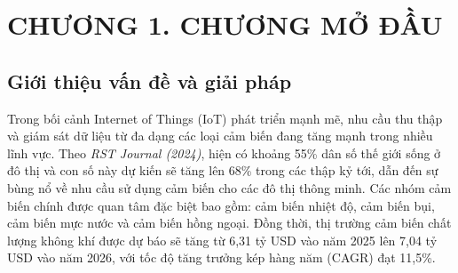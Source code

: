 \documentclass{article} %
\begin{document}


\tableofcontents 
\thispagestyle{empty}
\cleardoublepage


{\let\oldnumberline\numberline
\renewcommand{\numberline}{Hình~\oldnumberline}
\listoffigures} 
\newpage

{\let\oldnumberline\numberline
\renewcommand{\numberline}{Bảng~\oldnumberline}
\listoftables}
\newpage

\newpage

\section*{CHƯƠNG 1.  CHƯƠNG MỞ ĐẦU}
\setcounter{section}{1}
\subsection{Giới thiệu vấn đề và giải pháp}
Trong bối cảnh Internet of Things (IoT) phát triển mạnh mẽ, nhu cầu thu thập và giám sát dữ liệu từ đa dạng các loại cảm biến đang tăng mạnh trong nhiều lĩnh vực. Theo \textit{RST Journal (2024)}, hiện có khoảng 55\% dân số thế giới sống ở đô thị và con số này dự kiến sẽ tăng lên 68\% trong các thập kỷ tới, dẫn đến sự bùng nổ về nhu cầu sử dụng cảm biến cho các đô thị thông minh. Các nhóm cảm biến chính được quan tâm đặc biệt bao gồm: cảm biến nhiệt độ, cảm biến bụi, cảm biến mực nước và cảm biến hồng ngoại. Đồng thời, thị trường cảm biến chất lượng không khí được dự báo sẽ tăng từ 6,31 tỷ USD vào năm 2025 lên 7,04 tỷ USD vào năm 2026, với tốc độ tăng trưởng kép hàng năm (CAGR) đạt 11,5\%.
\end{document}
